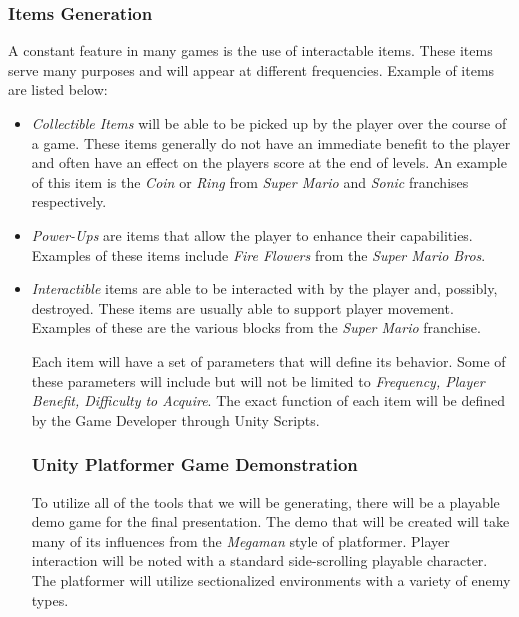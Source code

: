 \documentclass[pdftex,12pt,letter]{article}
\begin{document}
\begin{itemize}
\begin{itemize}
\subsubsection{Items Generation}
A constant feature in many games is the use of interactable items. These items serve many purposes and will appear at different frequencies. Example of items are listed below:
\begin{itemize}
\item \textit{Collectible Items} will be able to be picked up by the player over the course of a game. These items generally do not have an immediate benefit to the player and often have an effect on the players score at the end of levels. An example of this item is the \textit{Coin} or \textit{Ring} from \textit{Super Mario} and \textit{Sonic} franchises respectively. 

\item \textit{Power-Ups} are items that allow the player to enhance their capabilities. Examples of these items include \textit{Fire Flowers} from the \textit{Super Mario Bros}.

\item \textit{Interactible} items are able to be interacted with by the player and, possibly, destroyed. These items are usually able to support player movement. Examples of these are the various blocks from the \textit{Super Mario} franchise. \\

\endgroup

Each item will have a set of parameters that will define its behavior. Some of these parameters will include but will not be limited to \textit{Frequency, Player Benefit, Difficulty to Acquire}. The exact function of each item will be defined by the Game Developer through Unity Scripts. 
\\

\subsubsection{Unity Platformer Game Demonstration}
To utilize all of the tools that we will be generating, there will be a playable demo game for the final presentation. The demo that will be created will take many of its influences from the \textit{Megaman} style of platformer.  Player interaction will be noted with a standard side-scrolling playable character. The platformer will utilize sectionalized environments with a variety of enemy types. 
\\



\end{itemize}
\end{itemize}
\end{itemize}
\end{document}
